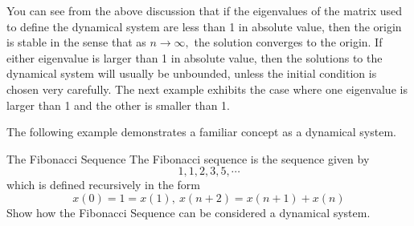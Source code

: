 You can see from the above discussion that if the eigenvalues of the matrix
used to define the dynamical system are less than 1 in absolute value, then
the origin is stable in the sense that as $n\rightarrow \infty ,$ the
solution converges to the origin. If either eigenvalue is larger than 1 in
absolute value, then the solutions to the dynamical system will usually be
unbounded, unless the initial condition is chosen very carefully. The next
example exhibits the case where one eigenvalue is larger than 1 and the
other is smaller than 1.

The following example demonstrates a familiar concept as a dynamical system.

\begin{example}{The Fibonacci Sequence}\label{exa:fibonacci}
The Fibonacci sequence is the sequence given by 
\begin{equation*}
1, 1, 2, 3, 5, \cdots
\end{equation*}
which is defined recursively in the
form
\begin{equation*}
x\left( 0\right) =1=x\left( 1\right) ,\ x\left( n+2\right) =x\left(
n+1\right) +x\left( n\right)
\end{equation*}
Show how the Fibonacci Sequence can be considered a dynamical system.
\end{example}

